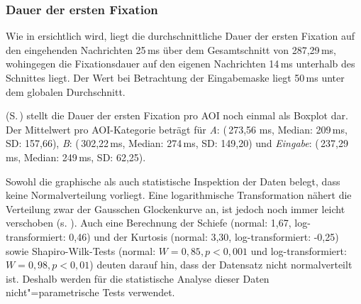 


\subsubsection{Dauer der ersten Fixation}
\label{K6:subsubsec:iaffd:DD}


Wie in  ersichtlich wird, liegt die durchschnittliche Dauer der ersten Fixation auf den eingehenden Nachrichten 25\,ms über dem Gesamtschnitt von 287,29\,ms, wohingegen die Fixationsdauer auf den eigenen Nachrichten 14\,ms unterhalb des Schnittes liegt. Der Wert bei Betrachtung der Eingabemaske liegt 50\,ms unter dem globalen Durchschnitt.

 (S.\,\pageref{K6:fig:DD:FFDur-AOI-boxplot}) stellt die Dauer der ersten Fixation pro AOI noch einmal als Boxplot dar. Der Mittelwert pro AOI-Kategorie beträgt für \emph{A}: (\diameter\,273,56 ms, Median: 209\,ms, SD: 157,66), \emph{B}: (\diameter\,302,22\,ms, Median: 274\,ms, SD: 149,20) und \emph{Eingabe}: (\diameter\,237,29\,ms, Median: 249\,ms, SD: 62,25). 

Sowohl die graphische als auch statistische Inspektion der Daten belegt, dass keine Normalverteilung vorliegt. Eine logarithmische Transformation nähert die Verteilung zwar der Gausschen Glockenkurve an, ist jedoch noch immer leicht verschoben (s. ). Auch eine Berechnung der Schiefe (normal: 1,67, log-transformiert: 0,46) und der Kurtosis (normal: 3,30, log-transformiert: -0,25) sowie Shapiro-Wilk-Tests (normal: $W = 0,85, p < 0,001$ und log-transformiert: $W = 0,98, p < 0,01$) deuten darauf hin, dass der Datensatz nicht normalverteilt ist. Deshalb werden für die statistische Analyse dieser Daten nicht"=parametrische Tests verwendet.


